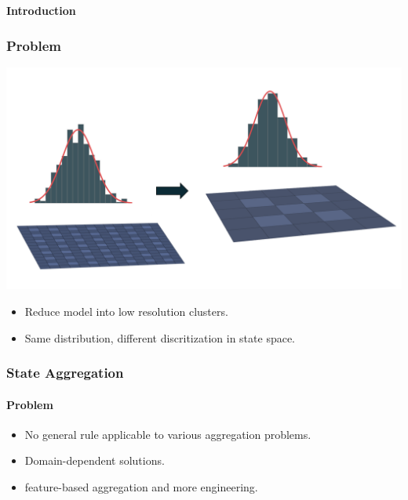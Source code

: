 \documentclass[mathserif]{beamer}
\begin{document}
    \begin{frame}
        \Huge \textbf{Introduction}
    \end{frame}


    \begin{frame}
        \frametitle{Problem}

        \includegraphics[width=0.9\columnwidth]{res/aggregation-distribution-before-after.pdf}

        \begin{itemize}
            \item Reduce model into low resolution clusters.
            \item Same distribution, different discritization in state space.
        \end{itemize}


    \end{frame}


    \begin{frame}
        \frametitle{State Aggregation}
        \framesubtitle{Problem}

        \begin{itemize}
            \item No general rule applicable to various aggregation problems.
            \item Domain-dependent solutions.
            \item feature-based aggregation and more engineering.
        \end{itemize}
    \end{frame}
\end{document}
